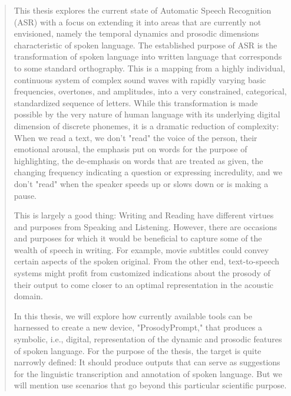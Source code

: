 
\begin{abstract}

This thesis explores the current state of Automatic Speech Recognition (ASR) with a focus on extending it into areas that are currently not envisioned, namely the temporal dynamics and prosodic dimensions characteristic of spoken language. The established purpose of ASR is the transformation of spoken language into written language that corresponds to some standard orthography. This is a mapping from a highly individual, continuous system of complex sound waves with rapidly varying basic frequencies, overtones, and amplitudes, into a very constrained, categorical, standardized sequence of letters. While this transformation is made possible by the very nature of human language with its underlying digital dimension of discrete phonemes, it is a dramatic reduction of complexity: When we read a text, we don't "read" the voice of the person, their emotional arousal, the emphasis put on words for the purpose of highlighting, the de-emphasis on words that are treated as given, the changing frequency indicating a question or expressing incredulity, and we don't "read" when the speaker speeds up or slows down or is making a pause.

This is largely a good thing: Writing and Reading have different virtues and purposes from Speaking and Listening. However, there are occasions and purposes for which it would be beneficial to capture some of the wealth of speech in writing. For example, movie subtitles could convey certain aspects of the spoken original. From the other end, text-to-speech systems might profit from customized indications about the prosody of their output to come closer to an optimal representation in the acoustic domain.

In this thesis, we will explore how currently available tools can be harnessed to create a new device, "ProsodyPrompt," that produces a symbolic, i.e., digital, representation of the dynamic and prosodic features of spoken language. For the purpose of the thesis, the target is quite narrowly defined: It should produce outputs that can serve as suggestions for the linguistic transcription and annotation of spoken language. But we will mention use scenarios that go beyond this particular scientific purpose.


\end{abstract}

